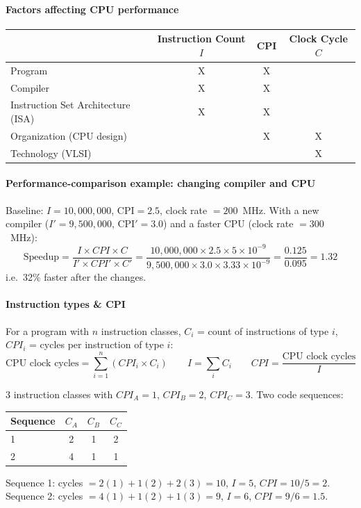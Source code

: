 \paragraph{Factors affecting CPU performance}
\begin{center}
\begin{tabular}{@{}lccc@{}}
\toprule
 & Instruction Count $I$ & CPI & Clock Cycle $C$ \\
\midrule
Program                              & X & X &   \\
Compiler                             & X & X &   \\
Instruction Set Architecture (ISA)   & X & X &   \\
Organization (CPU design)            &   & X & X \\
Technology (VLSI)                    &   &   & X \\
\bottomrule
\end{tabular}
\end{center}

\paragraph{Performance-comparison example: changing compiler and CPU}
\begin{eg}
Baseline: $I=10{,}000{,}000$, CPI$=2.5$, clock rate $=200$~MHz. With a new
compiler ($I'=9{,}500{,}000$, CPI$'=3.0$) and a faster CPU (clock rate
$=300$~MHz):
\[
  \text{Speedup} = \frac{I \times CPI \times C}{I' \times CPI' \times C'}
  = \frac{10{,}000{,}000\times2.5\times5\times10^{-9}}
         {9{,}500{,}000\times3.0\times3.33\times10^{-9}}
  = \frac{0.125}{0.095} = 1.32
\]
i.e.\ 32\% faster after the changes.
\end{eg}

\paragraph{Instruction types \& CPI}
\begin{prop}
For a program with $n$ instruction classes, $C_i$ = count of instructions of
type $i$, $CPI_i$ = cycles per instruction of type $i$:
\[
  \text{CPU clock cycles} = \sum_{i=1}^{n} \left(CPI_i \times C_i\right)
  \qquad I = \sum_i C_i \qquad CPI = \frac{\text{CPU clock cycles}}{I}
\]
\end{prop}

\begin{eg}
3 instruction classes with $CPI_A=1$, $CPI_B=2$, $CPI_C=3$. Two code
sequences:
\begin{center}
\begin{tabular}{@{}lccc@{}}
\toprule
Sequence & $C_A$ & $C_B$ & $C_C$ \\
\midrule
1 & 2 & 1 & 2 \\
2 & 4 & 1 & 1 \\
\bottomrule
\end{tabular}
\end{center}
Sequence 1: cycles $=2(1)+1(2)+2(3)=10$, $I=5$, $CPI=10/5=2$.
Sequence 2: cycles $=4(1)+1(2)+1(3)=9$, $I=6$, $CPI=9/6=1.5$.
\end{eg}

